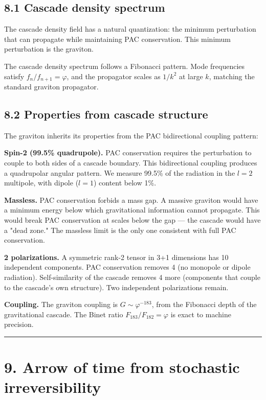 \documentclass[11pt,a4paper]{article}
\begin{document}
\subsection*{8.1 Cascade density spectrum}

The cascade density field has a natural quantization: the minimum perturbation that can propagate while maintaining PAC conservation. This minimum perturbation is the graviton.

The cascade density spectrum follows a Fibonacci pattern. Mode frequencies satisfy $f_n / f_{n+1} = \varphi$, and the propagator scales as $1/k^2$ at large $k$, matching the standard graviton propagator.

\subsection*{8.2 Properties from cascade structure}

The graviton inherits its properties from the PAC bidirectional coupling pattern:

\textbf{Spin-2 (99.5\% quadrupole).} PAC conservation requires the perturbation to couple to both sides of a cascade boundary. This bidirectional coupling produces a quadrupolar angular pattern. We measure 99.5\% of the radiation in the $l = 2$ multipole, with dipole ($l = 1$) content below 1\%.

\textbf{Massless.} PAC conservation forbids a mass gap. A massive graviton would have a minimum energy below which gravitational information cannot propagate. This would break PAC conservation at scales below the gap — the cascade would have a "dead zone." The massless limit is the only one consistent with full PAC conservation.

\textbf{2 polarizations.} A symmetric rank-2 tensor in 3+1 dimensions has 10 independent components. PAC conservation removes 4 (no monopole or dipole radiation). Self-similarity of the cascade removes 4 more (components that couple to the cascade's own structure). Two independent polarizations remain.

\textbf{Coupling.} The graviton coupling is $G \sim \varphi^{-183}$, from the Fibonacci depth of the gravitational cascade. The Binet ratio $F_{183}/F_{182} = \varphi$ is exact to machine precision.

\begin{center}\rule{0.5\linewidth}{0.4pt}\end{center}

\section*{9. Arrow of time from stochastic irreversibility}
\end{document}
